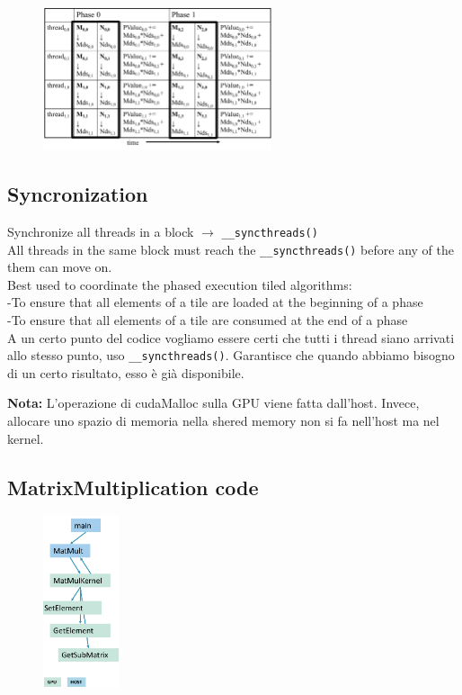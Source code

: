 \begin{figure}[ht]
	\centering
	\includegraphics[width=0.6\textwidth]{figure_parallel/execution_phases.png}
\end{figure}
\FloatBarrier

\subsection{Syncronization}
Synchronize all threads in a block $\rightarrow$ \texttt{\_\_syncthreads()}\\
All threads in the same block must reach the \texttt{\_\_syncthreads()} before any of the them can move on.\\
Best used to coordinate the phased execution tiled algorithms:\\
-To ensure that all elements of a tile are loaded at the beginning of a
phase\\
-To ensure that all elements of a tile are consumed at the end of a
phase\\

A un certo punto del codice vogliamo essere certi che tutti i thread siano arrivati allo stesso punto, uso \texttt{\_\_syncthreads()}. Garantisce che quando abbiamo bisogno di un certo risultato, esso è già disponibile.

\textbf{Nota:} L'operazione di cudaMalloc sulla GPU viene fatta dall'host. Invece, allocare uno spazio di memoria nella shered memory non si fa nell'host ma nel kernel.
\subsection{MatrixMultiplication code}

\begin{figure}[ht]
	\centering
	\includegraphics[width=0.2\textwidth]{figure_parallel/mm_code.png}
\end{figure}
\FloatBarrier

